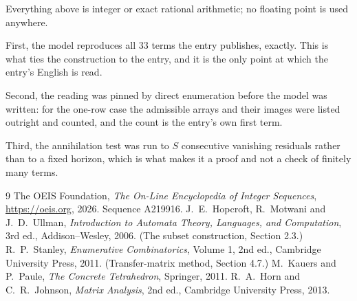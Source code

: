 \documentclass[11pt,a4paper]{article}
\theoremstyle{plain}
\theoremstyle{definition}
\begin{document}
Everything above is integer or exact rational arithmetic; no floating point is used anywhere.

First, the model reproduces all $33$ terms the entry publishes, exactly. This is what
ties the construction to the entry, and it is the only point at which the entry's English is
read.

Second, the reading was pinned by direct enumeration before the model was written: for the
one-row case the admissible arrays and their images were listed outright and counted, and the
count is the entry's own first term.

Third, the annihilation test was run to $S$ consecutive vanishing residuals rather than to a
fixed horizon, which is what makes it a proof and not a check of finitely many terms.

\begin{thebibliography}{9}
 The OEIS Foundation, \emph{The On-Line Encyclopedia of Integer
Sequences}, \url{https://oeis.org}, 2026. Sequence A219916.
 J.~E.~Hopcroft, R.~Motwani and J.~D.~Ullman, \emph{Introduction to Automata
Theory, Languages, and Computation}, 3rd ed., Addison--Wesley, 2006. (The subset
construction, Section 2.3.)
 R.~P.~Stanley, \emph{Enumerative Combinatorics}, Volume 1, 2nd ed.,
Cambridge University Press, 2011. (Transfer-matrix method, Section 4.7.)
 M.~Kauers and P.~Paule, \emph{The Concrete Tetrahedron}, Springer, 2011.
 R.~A.~Horn and C.~R.~Johnson, \emph{Matrix Analysis}, 2nd ed., Cambridge
University Press, 2013.
\end{thebibliography}
\end{document}
